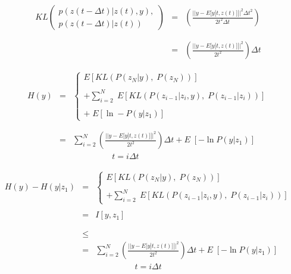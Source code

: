 {{\vfill
\begin{eqnarray*}
  KL\left(\begin{array}{l}p(z(t-\Delta t)|z(t),y), \\p(z(t-\Delta  t)|z(t))\end{array}\right)
  & = & \left(\frac{||y-E[y|t,z(t)]||^2\Delta t^2}{2t^2\Delta t}\right) \\
  \\
  \\
  & =  & \left(\frac{||y-E[y|t,z(t)]||^2}{2t^2}\right) \Delta t
\end{eqnarray*}
}

\begin{eqnarray*}
  H(y) & = & \left\{\begin{array}{l} E[KL(P(z_N|y),\;P(z_N))] \\ \\ + \sum_{i=2}^N  \; E[KL(P(z_{i-1}|z_i,y),\;P(z_{i-1}|z_i))] \\ \\ +\;E[\ln -P(y|z_1)] \end{array}\right.
  \\
  \\
  \\
  & = & \sum_{i = 2}^N  \left(\frac{||y-E[y|t,z(t)]||^2}{2t^2}\right) \Delta t + E\;[- \ln P(y|z_1)] \\
  & & \;\;\;\;\;\;\;\;\;\;\;\;\;\;\;\;\;t = i\Delta t
\end{eqnarray*}

\begin{eqnarray*}
  H(y) - H(y|z_1) & = & \left\{\begin{array}{l} E[KL(P(z_N|y),\;P(z_N))] \\ \\ + \sum_{i=2}^N  \; E[KL(P(z_{i-1}|z_i,y),\;P(z_{i-1}|z_i))] \end{array}\right.
  \\
  \\
  & = & I[y,z_1] \\
  \\
  \\
  &\leq & 
  \\
  & = & \sum_{i = 2}^N  \left(\frac{||y-E[y|t,z(t)]||^2}{2t^2}\right) \Delta t + E\;[- \ln P(y|z_1)] \\
  & & \;\;\;\;\;\;\;\;\;\;\;\;\;\;\;\;\;t = i\Delta t
\end{eqnarray*}


}
